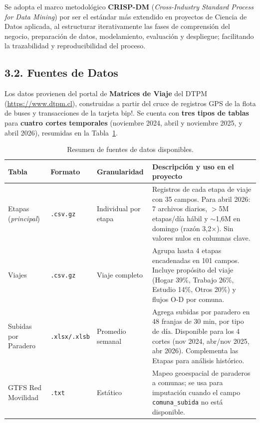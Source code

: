 \documentclass[11pt,letterpaper]{article}
\begin{document}
Se adopta el marco metodológico \textbf{CRISP-DM} (\textit{Cross-Industry Standard Process for Data Mining}) por ser el estándar más extendido en proyectos de Ciencia de Datos aplicada, al estructurar iterativamente las fases de comprensión del negocio, preparación de datos, modelamiento, evaluación y despliegue; facilitando la trazabilidad y reproducibilidad del proceso.

\subsection*{3.2. Fuentes de Datos}
Los datos provienen del portal de \textbf{Matrices de Viaje} del DTPM (\url{https://www.dtpm.cl}), construidas a partir del cruce de registros GPS de la flota de buses y transacciones de la tarjeta bip!. Se cuenta con \textbf{tres tipos de tablas} para \textbf{cuatro cortes temporales} (noviembre 2024, abril y noviembre 2025, y abril 2026), resumidas en la Tabla~\ref{tab:fuentes}.

\begin{table}[h!]
\centering
\small
\renewcommand{\arraystretch}{1.3}
\begin{tabularx}{\textwidth}{@{}l l l X@{}}
\toprule
\rowcolor{primary!12}
\textbf{Tabla} & \textbf{Formato} & \textbf{Granularidad} & \textbf{Descripción y uso en el proyecto} \\
\midrule
Etapas (\textit{principal}) & \texttt{.csv.gz} & Individual por etapa & Registros de cada etapa de viaje con 35 campos. Para abril 2026: 7 archivos diarios, $>$5M etapas/día hábil y $\sim$1{,}6M en domingo (razón 3{,}2$\times$). Sin valores nulos en columnas clave. \\
\addlinespace
Viajes & \texttt{.csv.gz} & Viaje completo & Agrupa hasta 4 etapas encadenadas en 101 campos. Incluye propósito del viaje (Hogar 39\%, Trabajo 26\%, Estudio 14\%, Otros 20\%) y flujos O-D por comuna. \\
\addlinespace
Subidas por Paradero & \texttt{.xlsx/.xlsb} & Promedio semanal & Agrega subidas por paradero en 48 franjas de 30 min, por tipo de día. Disponible para los 4 cortes (nov 2024, abr/nov 2025, abr 2026). Complementa las Etapas para análisis histórico.\\
\addlinespace
GTFS Red Movilidad & \texttt{.txt} & Estático & Mapeo geoespacial de paraderos a comunas; se usa para imputación cuando el campo \texttt{comuna\_subida} no está disponible. \\
\bottomrule
\end{tabularx}
\caption{Resumen de fuentes de datos disponibles.}
\label{tab:fuentes}
\end{table}
\end{document}
